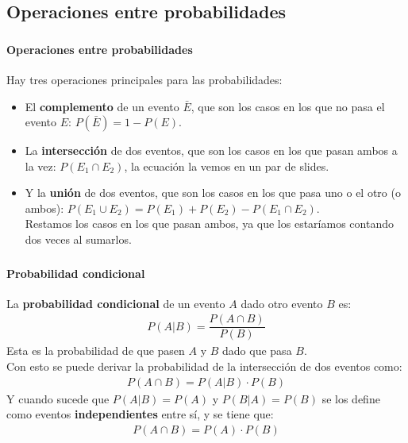 \documentclass{beamer}
\begin{document}
\subsection{Operaciones entre probabilidades}

\begin{frame}
  \frametitle{\SECTIONA}
  \framesubtitle{Operaciones entre probabilidades}

  Hay tres operaciones principales para las probabilidades:
  \begin{itemize}
    \item<2-> El \textbf{complemento} de un evento \(\bar{E}\), que son los casos en los que no pasa el evento \(E\): \(P(\bar{E}) = 1 - P(E)\).
    \item<3-> La \textbf{intersección} de dos eventos, que son los casos en los que pasan ambos a la vez: \(P(E_{1} \cap E_{2})\), la ecuación la vemos en un par de slides.
    \item<4-> Y la \textbf{unión} de dos eventos, que son los casos en los que pasa uno o el otro (o ambos): \(P(E_{1} \cup E_{2}) = P(E_{1}) + P(E_{2}) - P(E_{1} \cap E_{2})\). \pause \\
      Restamos los casos en los que pasan ambos, ya que los estaríamos contando dos veces al sumarlos.
  \end{itemize}
\end{frame}

\begin{frame}
  \frametitle{\SECTIONA}
  \framesubtitle{Probabilidad condicional}

  La \textbf{probabilidad condicional} de un evento \(A\) dado otro evento \(B\) es:
  \begin{gather*}
    P(A | B) = \dfrac{P(A \cap B)}{P(B)}
  \end{gather*}
  Esta es la probabilidad de que pasen \(A\) y \(B\) dado que pasa \(B\). \pause \\
  Con esto se puede derivar la probabilidad de la intersección de dos eventos como:
  \begin{gather*}
    P(A \cap B) = P(A | B) \cdot P(B)
  \end{gather*} \pause
  Y cuando sucede que \(P(A|B) = P(A)\) y \(P(B|A) = P(B)\) se los define como eventos \textbf{independientes} entre sí, y se tiene que:
  \begin{gather*}
    P(A \cap B) = P(A) \cdot P(B)
  \end{gather*}
\end{frame}
\end{document}
